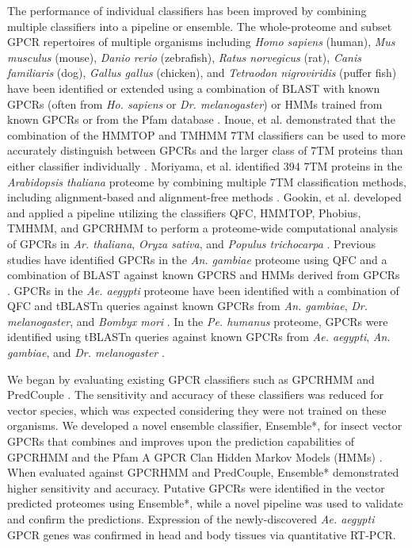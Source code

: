 The performance of individual classifiers has been improved by combining multiple classifiers into a pipeline or ensemble.  The whole-proteome and subset GPCR repertoires of multiple organisms including \emph{Homo sapiens} (human), \emph{Mus musculus} (mouse), \emph{Danio rerio} (zebrafish), \emph{Ratus norvegicus} (rat), \emph{Canis familiaris} (dog), \emph{Gallus gallus} (chicken), and \emph{Tetraodon nigroviridis} (puffer fish) have been identified or extended using a combination of BLAST with known GPCRs (often from \emph{Ho. sapiens} or \emph{Dr. melanogaster}) or HMMs trained from known GPCRs or from the Pfam database \cite{Bjarnadottir2004, Bjarnadottir2006, Fredriksson2003,Fredriksson2005, Gloriam2005, Haitina2009, Lagerstrom2006, Metpally2005, Metpally2005a, Vassilatis2003, Zhang2002, Zozulya2001}. Inoue, et al. demonstrated that the combination of the HMMTOP and TMHMM 7TM classifiers can be used to more accurately distinguish between GPCRs and the larger class of 7TM proteins than either classifier individually \cite{Inoue2005}. Moriyama, et al. identified 394 7TM proteins in the \emph{Arabidopsis thaliana} proteome by combining multiple 7TM classification methods, including alignment-based and alignment-free methods \cite{Moriyama2006}. Gookin, et al. developed and applied a pipeline utilizing the classifiers QFC, HMMTOP, Phobius, TMHMM, and GPCRHMM to perform a proteome-wide computational analysis of GPCRs in \emph{Ar. thaliana}, \emph{Oryza sativa}, and \emph{Populus trichocarpa} \cite{Gookin2008}.  Previous studies have identified GPCRs in the \emph{An. gambiae} proteome using QFC \cite{Hill2002} and a combination of BLAST against known GPCRS and HMMs derived from GPCRs \cite{Fredriksson2005}. GPCRs in the \emph{Ae. aegypti} proteome have been identified with a combination of QFC and tBLASTn queries against known GPCRs from \emph{An. gambiae}, \emph{Dr. melanogaster}, and \emph{Bombyx mori} \cite{Nene2007}.  In the \emph{Pe. humanus} proteome, GPCRs were identified using tBLASTn queries against known GPCRs from \emph{Ae. aegypti}, \emph{An. gambiae}, and \emph{Dr. melanogaster} \cite{Kirkness2010}.

We began by evaluating existing GPCR classifiers such as GPCRHMM \cite{Wistrand2006} and PredCouple \cite{Sgourakis2005,Sgourakis2005a}.  The sensitivity and accuracy of these classifiers was reduced for vector species, which was expected considering they were not trained on these organisms.  We developed a novel ensemble classifier, Ensemble*, for insect vector GPCRs that combines and improves upon the prediction capabilities of GPCRHMM and the Pfam A GPCR Clan Hidden Markov Models (HMMs) \cite{Punta2012}.  When evaluated against GPCRHMM and PredCouple, Ensemble* demonstrated higher sensitivity and accuracy.  Putative GPCRs were identified in the vector predicted proteomes using Ensemble*, while a novel pipeline was used to validate and confirm the predictions. Expression of the newly-discovered \emph{Ae. aegypti} GPCR genes was confirmed in head and body tissues via quantitative RT-PCR.

